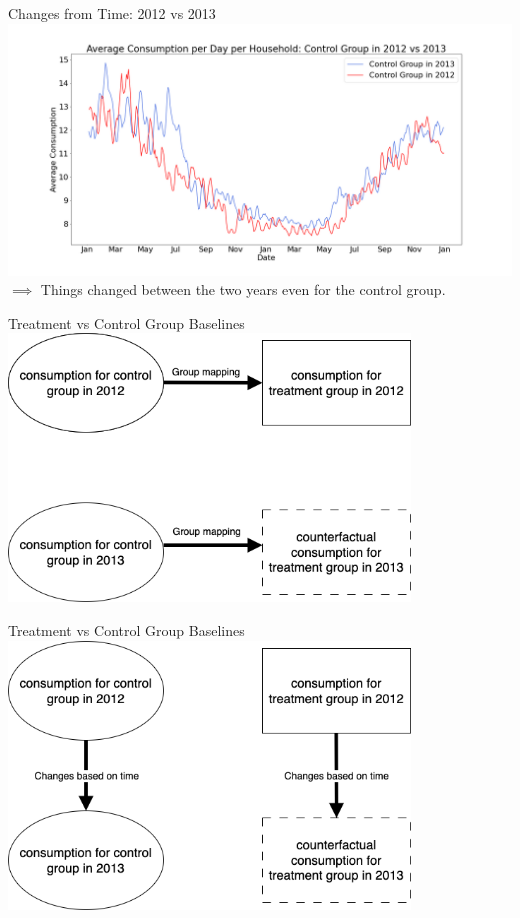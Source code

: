 \documentclass{beamer}
\begin{document}
\begin{frame}{Changes from Time: 2012 vs 2013}
  \centering
  \includegraphics[width=1\textwidth]{images/yoy-changes-control-group.png}
  $\implies$ Things changed between the two years even for the control group.
\end{frame}

\begin{frame}{Treatment vs Control Group Baselines}
  \centering
  \includegraphics[width=0.8\textwidth]{images/group-mapping.png}
\end{frame}

\begin{frame}{Treatment vs Control Group Baselines}
  \centering
  \includegraphics[width=0.8\textwidth]{images/yoy-mapping.png}
\end{frame}
\end{document}
